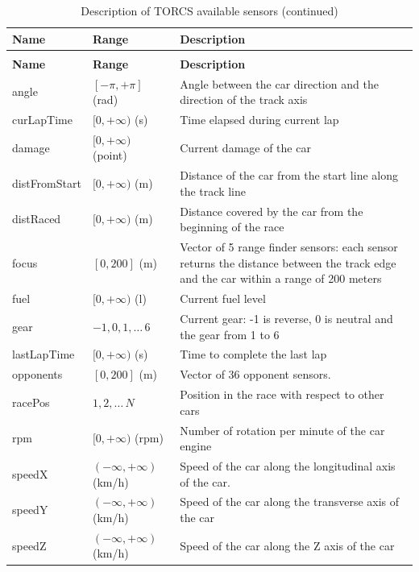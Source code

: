 \documentclass[binding=0.6cm,Lau,oneside]{sapthesis} %
\begin{document}
\begin{longtable}{p{}p{}p{}}
\caption{Description of TORCS available sensors}\\
\toprule
\textbf{Name}          & \textbf{Range}            & \textbf{Description}    \\
\midrule
\endfirsthead
\caption{Description of TORCS available sensors (continued)}\\
\toprule
\textbf{Name}          & \textbf{Range}            & \textbf{Description}    \\
\midrule
\endhead
\bottomrule
\endfoot
angle         & $[-\pi, +\pi]$ (rad)  & Angle between the car direction and the direction of the track axis      \\
curLapTime    & $[0, +\infty)$ (s)      & Time elapsed during current lap    \\
damage        & $[0, +\infty)$ (point)  & Current damage of the car    \\
distFromStart & $[0, +\infty)$ (m)      & Distance of the car from the start line along the track line             \\
distRaced     & $[0, +\infty)$ (m)       & Distance covered by the car from the beginning of the race \\
focus         & $[0, 200]$ (m)      & Vector of 5 range finder sensors: each sensor returns the distance between the track edge and the car within a range of 200 meters   \\
fuel          & $[0, +\infty)$ (l)       & Current fuel level           \\
gear          & ${-1, 0, 1, \dots\, 6}$ & Current gear: -1 is reverse, 0 is neutral and the gear from 1 to 6       \\
lastLapTime   & $[0, +\infty)$ (s)       & Time to complete the last lap\\
opponents     & $[0, 200]$ (m)      & Vector of 36 opponent sensors.     \\
racePos       & ${1, 2, \dots\, N}$    & Position in the race with respect to other cars  \\
rpm           & $[0, +\infty)$ (rpm)     & Number of rotation per minute of the car engine  \\
speedX        & $(-\infty, +\infty)$ (km/h)   & Speed of the car along the longitudinal axis of the car.   \\
speedY        & $(-\infty, +\infty)$ (km/h)   & Speed of the car along the transverse axis of the car\\
speedZ        & $(-\infty, +\infty)$ (km/h)   & Speed of the car along the Z axis of the car     \\

\end{longtable}
\end{document}
